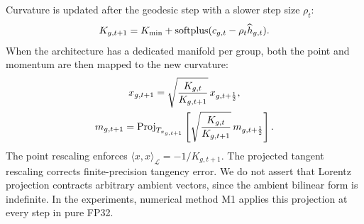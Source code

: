 Curvature is updated after the geodesic step with a slower step size $\rho_t$:
\begin{equation}
K_{g,t+1}=K_{\min}+\operatorname{softplus}(c_{g,t}-\rho_t\widehat h_{g,t}).
\label{eq:k-step-main}
\end{equation}
When the architecture has a dedicated manifold per group, both the point and momentum are then mapped to the new curvature:
\begin{equation}
\begin{gathered}
x_{g,t+1}=\sqrt{\frac{K_{g,t}}{K_{g,t+1}}}\,x_{g,t+\frac12},\\
m_{g,t+1}=\operatorname{Proj}_{T_{x_{g,t+1}}}\left[\sqrt{\frac{K_{g,t}}{K_{g,t+1}}}\,m_{g,t+\frac12}\right].
\end{gathered}
\label{eq:xcurv-main}
\end{equation}
The point rescaling enforces $\langle x,x\rangle_{\mathcal L}=-1/K_{g,t+1}$. The projected tangent rescaling corrects finite-precision tangency error. We do not assert that Lorentz projection contracts arbitrary ambient vectors, since the ambient bilinear form is indefinite. In the experiments, numerical method M1 applies this projection at every step in pure FP32.

\begin{center}
\end{center}
